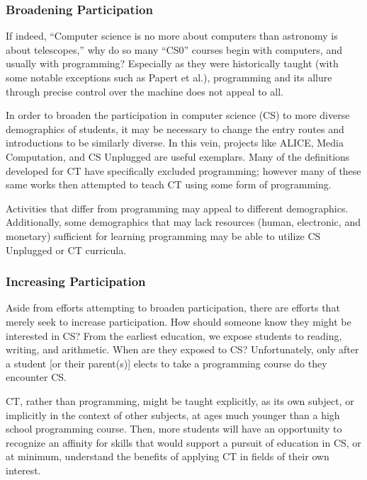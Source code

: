 \documentclass{acm_proc_article-sp}
\begin{document}
\subsubsection{Broadening Participation}
If indeed, ``Computer science is no more about computers than astronomy is about telescopes,''\cite{cs-astronomy} why do so many ``CS0'' courses begin with computers, and usually with programming? Especially as they were historically taught (with some notable exceptions such as Papert et al.)\cite{logo-readings}, programming and its allure through precise control over the machine does not appeal to all.

In order to broaden the participation in computer science (CS) to more diverse demographics of students, it may be necessary to change the entry routes and introductions to be similarly diverse. 
In this vein, projects like ALICE\cite{pausch1995alice}, Media Computation\cite{guzdial2003media}, and CS Unplugged\cite{csunplugged} are useful exemplars.
Many of the definitions developed for CT have specifically excluded programming; however many of these same works then attempted to teach CT using some form of programming.

Activities that differ from programming may appeal to different demographics.
Additionally, some demographics that may lack resources (human, electronic, and monetary) sufficient for learning programming may be able to utilize CS Unplugged or CT curricula.

\subsubsection{Increasing Participation}
Aside from efforts attempting to broaden participation, there are efforts that merely seek to increase participation.
How should someone know they might be interested in CS?
From the earliest education, we expose students to reading, writing, and arithmetic.
When are they exposed to CS?
Unfortunately, only after a student [or their parent(s)] elects to take a programming course do they encounter CS. 

CT, rather than programming, might be taught explicitly, as its own subject, or implicitly in the context of other subjects, at ages much younger than a high school programming course.
Then, more students will have an opportunity to recognize an affinity for skills that would support a pursuit of education in CS, or at minimum, understand the benefits of applying CT in fields of their own interest.
\end{document}
